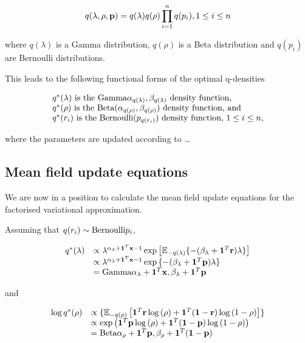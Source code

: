 \documentclass{amsart}[12pt]
\begin{document}
$$
q(\lambda, \rho, {\bf p}) = q(\lambda) q(\rho) \prod_{i=1}^n q(p_i), 1 \leq i \leq n
$$

\noindent where $q(\lambda)$ is a Gamma distribution, $q(\rho)$ is a Beta distribution and
$q(p_i)$ are Bernoulli distributions.

\noindent This leads to the following functional forms of the optimal q-densities

$$
\begin{array}{l}
\mbox{$q^*(\lambda)$ is the $\text{Gamma} \alpha_{q(\lambda)}, \beta_{q(\lambda)}$ density function,} \\
\mbox{$q^*(\rho)$ is the $\text{Beta}(\alpha_{q(\rho)}, \beta_{q(\rho)})$ density function, and} \\
\mbox{$q^*(r_i)$  is the $\text{Bernoulli}(p_{q(r_i)})$ density function, $1 \leq i \leq n$,}
\end{array}
$$

\noindent where the parameters are updated according to \ldots


\subsection{Mean field update equations}
We are now in a position to calculate the mean field update equations for the factorised
variational approximation.

Assuming that $q(r_i) \sim \text{Bernoulli} p_i$,

$$
\begin{array}{ll}
q^*(\lambda) &\propto \lambda^{\alpha_\lambda+{\bf 1}^T{\bf x} - 1} \exp{\left[ {\mathbb E}_{-q(\lambda)} \{-(\beta_\lambda + {\bf1}^T{\bf r}) \lambda \} \right]} \\
&\propto \lambda^{\alpha_\lambda+{\bf 1}^T{\bf x} - 1} \exp{\{-(\beta_\lambda + {\bf1}^T{\bf p})\lambda \} } \\
&= \text{Gamma} \alpha_\lambda+{\bf 1}^T{\bf x}, \beta_\lambda+{\bf 1}^T{\bf p}
\end{array}
$$

and

$$
\begin{array}{ll}
\log{q^*(\rho)} &\propto \{ {\mathbb E}_{-q(\rho)} \left[ {\bf 1}^T{\bf r} \log{(\rho)} + {\bf 1}^T({\bf 1} - {\bf r}) \log{(1 - \rho)} \right] \} \\
&\propto \exp{ \left( {\bf1}^T{\bf p}\log{(\rho)} + {\bf1}^T({\bf1}- {\bf p}) \log{(1 - \rho)} \right) } \\
&= \text{Beta} \alpha_\rho + {\bf 1}^T{\bf p}, \beta_\rho + {\bf 1}^T({\bf 1} - {\bf p})
\end{array}
$$
\end{document}
